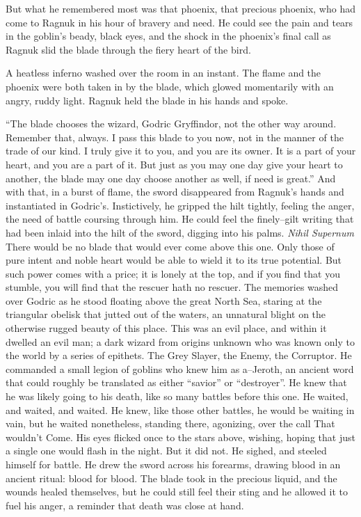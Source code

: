 But what he remembered most was that phoenix, that precious phoenix, who had come to Ragnuk in his hour of bravery and need. He could see the pain and tears in the goblin’s beady, black eyes, and the shock in the phoenix’s final call as Ragnuk slid the blade through the fiery heart of the bird.

A heatless inferno washed over the room in an instant. The flame and the phoenix were both taken in by the blade, which glowed momentarily with an angry, ruddy light. Ragnuk held the blade in his hands and spoke.

“The blade chooses the wizard, Godric Gryffindor, not the other way around. Remember that, always. I pass this blade to you now, not in the manner of the trade of our kind. I truly give it to you, and you are its owner. It is a part of your heart, and you are a part of it. But just as you may one day give your heart to another, the blade may one day choose another as well, if need is great.”
\SmallVSpace
And with that, in a burst of flame, the sword disappeared from Ragnuk’s hands and instantiated in Godric’s. Instictively, he gripped the hilt tightly, feeling the anger, the need of battle coursing through him. He could feel the finely\mbox{--}gilt writing that had been inlaid into the hilt of the sword, digging into his palms.
\SomeVSpace
\emph{Nihil Supernum}
\SomeVSpace
There would be no blade that would ever come above this one. Only those of pure intent and noble heart would be able to wield it to its true potential. But such power comes with a price; it is lonely at the top, and if you find that you stumble, you will find that the rescuer hath no rescuer.
\SomeVSpace
The memories washed over Godric as he stood floating above the great North Sea, staring at the triangular obelisk that jutted out of the waters, an unnatural blight on the otherwise rugged beauty of this place. This was an evil place, and within it dwelled an evil man; a dark wizard from origins unknown who was known only to the world by a series of epithets. The Grey Slayer, the Enemy, the Corruptor. He commanded a small legion of goblins who knew him as a\mbox{--}Jeroth, an ancient word that could roughly be translated as either “savior” or “destroyer”.
\SmallVSpace
He knew that he was likely going to his death, like so many battles before this one. He waited, and waited, and waited. He knew, like those other battles, he would be waiting in vain, but he waited nonetheless, standing there, agonizing, over the call{\el}
\SmallVSpace
That wouldn’t{\el}
\SmallVSpace
Come.
\SmallVSpace
His eyes flicked once to the stars above, wishing, hoping that just a single one would flash in the night. But it did not. He sighed, and steeled himself for battle. He drew the sword across his forearms, drawing blood in an ancient ritual: blood for blood. The blade took in the precious liquid, and the wounds healed themselves, but he could still feel their sting and he allowed it to fuel his anger, a reminder that death was close at hand.
